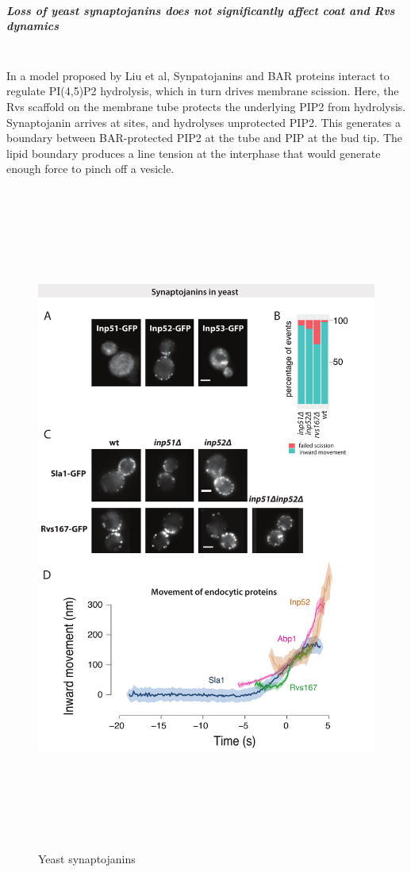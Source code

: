 	\subparagraph{Loss of yeast synaptojanins does not significantly affect coat and Rvs dynamics}
	\mbox{}\\
	In a model proposed by Liu et al, Synpatojanins and BAR proteins interact to regulate PI(4,5)P2 hydrolysis, which in turn drives membrane scission. Here, the Rvs scaffold on the membrane tube protects the underlying PIP2 from hydrolysis. Synaptojanin arrives at sites, and hydrolyses unprotected PIP2. This generates a boundary between BAR-protected PIP2 at the tube and PIP at the bud tip. The lipid boundary produces a line tension at the interphase that would generate enough force to pinch off a vesicle. 
	
		\begin{figure}
		\centering
		\includegraphics[width=22cm,height=22cm,keepaspectratio]{figures/results_final/inp}
		\caption{Yeast synaptojanins \label{fig4_inp}}
		\end{figure}
		
